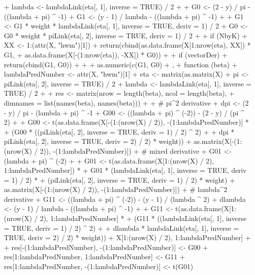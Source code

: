 \documentclass[
]{jss}
\newcommand{\1}{\mathcal{I}} \newcommand{\bZero}{\boldsymbol{0}}
\begin{document}
\begin{CodeChunk}
\begin{CodeInput}
{{{+         lambda <- lambdaLink(eta[, 1], inverse = TRUE) / 2
+         
+         G0 <- (2 - y) / pi     - ((lambda + pi) ^ -1)
+         G1 <- (y - 1) / lambda - ((lambda + pi) ^ -1)
+         
+         G1 <- G1 * weight * lambdaLink(eta[, 1], inverse = TRUE, deriv = 1) / 2
+         G0 <- G0 * weight *     piLink(eta[, 2], inverse = TRUE, deriv = 1) / 2
+         
+         if (NbyK) {
+           XX <- 1:(attr(X, "hwm")[1])
+           return(cbind(as.data.frame(X[1:nrow(eta), XX]) * G1,
+                        as.data.frame(X[-(1:nrow(eta)), -XX]) * G0))
+         }
+         if (vectorDer) {
+           return(cbind(G1, G0))
+         }
+         
+         as.numeric(c(G1, G0) %
+       },
+       function (beta) {
+         lambdaPredNumber <- attr(X, "hwm")[1]
+         eta <- matrix(as.matrix(X) %
+         pi     <-     piLink(eta[, 2], inverse = TRUE) / 2
+         lambda <- lambdaLink(eta[, 1], inverse = TRUE) / 2
+ 
+         res <- matrix(nrow = length(beta), ncol = length(beta), 
+                       dimnames = list(names(beta), names(beta)))
+         
+         # pi^2 derivative
+         dpi <- (2 - y) / pi - (lambda + pi) ^ -1
+         G00 <- ((lambda + pi) ^ (-2)) - (2 - y) / (pi ^ 2)
+         
+         G00 <- t(as.data.frame(X[-(1:(nrow(X) / 2)), -(1:lambdaPredNumber)] * 
+         (G00 * ((piLink(eta[, 2], inverse = TRUE, deriv = 1) / 2) ^ 2) + 
+         dpi * piLink(eta[, 2], inverse = TRUE, deriv = 2) / 2) * weight)) %
+         as.matrix(X[-(1:(nrow(X) / 2)), -(1:lambdaPredNumber)])
+         # mixed derivative
+         G01 <- (lambda + pi) ^ (-2)
+         
+         G01 <- t(as.data.frame(X[1:(nrow(X) / 2), 1:lambdaPredNumber]) * 
+         G01 * (lambdaLink(eta[, 1], inverse = TRUE, deriv = 1) / 2) * 
+         (piLink(eta[, 2], inverse = TRUE, deriv = 1) / 2) * weight) %
+         as.matrix(X[-(1:(nrow(X) / 2)), -(1:lambdaPredNumber)])
+         # lambda^2 derivative
+         G11 <- ((lambda + pi) ^ (-2)) - (y - 1) / (lambda ^ 2)
+         dlambda <- (y - 1) / lambda - ((lambda + pi) ^ -1)
+         
+         G11 <- t(as.data.frame(X[1:(nrow(X) / 2), 1:lambdaPredNumber] * 
+         (G11 * ((lambdaLink(eta[, 1], inverse = TRUE, deriv = 1) / 2) ^ 2) + 
+         dlambda * lambdaLink(eta[, 1], inverse = TRUE, deriv = 2) / 2) * weight)) %
+         X[1:(nrow(X) / 2), 1:lambdaPredNumber]
+         
+         res[-(1:lambdaPredNumber), -(1:lambdaPredNumber)] <- G00
+         res[1:lambdaPredNumber, 1:lambdaPredNumber] <- G11
+         res[1:lambdaPredNumber, -(1:lambdaPredNumber)] <- t(G01)
}}}
\end{CodeInput}
\end{CodeChunk}
\end{document}
